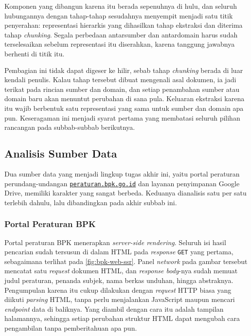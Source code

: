 Komponen yang dibangun karena itu berada sepenuhnya di hulu, dan seluruh hubungannya dengan tahap-tahap sesudahnya menyempit menjadi satu titik penyerahan: representasi hierarkis yang dihasilkan tahap ekstraksi dan diterima tahap \textit{chunking}.
Segala perbedaan antarsumber dan antardomain harus sudah terselesaikan sebelum representasi itu diserahkan, karena tanggung jawabnya berhenti di titik itu.

Pembagian ini tidak dapat digeser ke hilir, sebab tahap \textit{chunking} berada di luar kendali penulis.
Kalau tahap tersebut dibuat mengenali asal dokumen, ia jadi terikat pada rincian sumber dan domain, dan setiap penambahan sumber atau domain baru akan menuntut perubahan di sana pula.
Keluaran ekstraksi karena itu wajib berbentuk satu representasi yang sama untuk sumber dan domain apa pun. Keseragaman ini menjadi syarat pertama yang membatasi seluruh pilihan rancangan pada subbab-subbab berikutnya.

\subsection{Analisis Sumber Data}
\label{sec:analisis-sumber-data}

Dua sumber data yang menjadi lingkup tugas akhir ini, yaitu portal peraturan perundang-undangan \href{https://peraturan.bpk.go.id}{\texttt{peraturan.\allowbreak bpk.\allowbreak go.\allowbreak id}} dan layanan penyimpanan Google Drive, memiliki karakter yang sangat berbeda.
Keduanya dianalisis satu per satu terlebih dahulu, lalu dibandingkan pada akhir subbab ini.

\subsubsection{Portal Peraturan BPK}
\label{sec:analisis-bpk}

Portal peraturan BPK menerapkan \textit{server-side rendering}.
Seluruh isi hasil pencarian sudah tersusun di dalam HTML pada \textit{response} \texttt{GET} yang pertama, sebagaimana terlihat pada \autoref{fig:bpk-web-ssr}.
Panel \textit{network} pada gambar tersebut mencatat satu \textit{request} dokumen HTML, dan \textit{response body}-nya sudah memuat judul peraturan, penanda subjek, nama berkas unduhan, hingga abstraknya.
Pengumpulan karena itu cukup dilakukan dengan \textit{request} HTTP biasa yang diikuti \textit{parsing} HTML, tanpa perlu menjalankan JavaScript maupun mencari \textit{endpoint} data di baliknya.
Yang diambil dengan cara itu adalah tampilan halamannya, sehingga setiap perubahan struktur HTML dapat mengubah cara pengambilan tanpa pemberitahuan apa pun.

